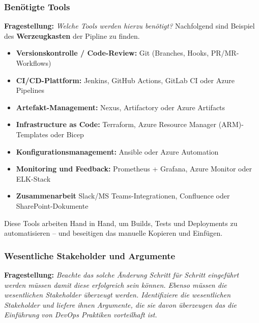 \subsubsection{Benötigte Tools}

\textbf{Fragestellung:} \textit{Welche Tools werden hierzu benötigt?}
Nachfolgend sind Beispiel des \textbf{Werzeugkasten} der Pipline zu finden.
\begin{itemize}
    \item \textbf{Versionskontrolle / Code-Review:} Git (Branches, Hooks, PR/MR-Workflows)
    \item \textbf{CI/CD-Plattform:} Jenkins, GitHub Actions, GitLab CI oder Azure Pipelines
    \item \textbf{Artefakt-Management:} Nexus, Artifactory oder Azure Artifacts
    \item \textbf{Infrastructure as Code:} Terraform, Azure Resource Manager (ARM)-Templates oder Bicep
    \item \textbf{Konfigurationsmanagement:} Ansible oder Azure Automation
    \item \textbf{Monitoring und Feedback:} Prometheus + Grafana, Azure Monitor oder ELK-Stack
    \item \textbf{Zusammenarbeit} Slack/MS Teams-Integrationen, Confluence oder SharePoint-Dokumente
\end{itemize}
Diese Tools arbeiten Hand in Hand, um Builds, Tests und Deployments zu automatisieren – und beseitigen das manuelle Kopieren und Einfügen.

\subsubsection{Wesentliche Stakeholder und Argumente}

\textbf{Fragestellung:} \textit{Beachte das solche Änderung Schritt für Schritt eingeführt werden müssen damit diese
erfolgreich sein können. Ebenso müssen die wesentlichen Stakeholder überzeugt werden.
Identifiziere die wesentlichen Stakeholder und liefere ihnen Argumente, die sie davon
überzeugen das die Einführung von DevOps Praktiken vorteilhaft ist.}

